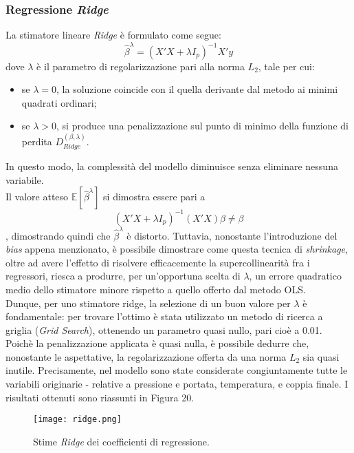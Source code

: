 \documentclass[fleqn,10pt]{SelfArx} %
\begin{document}
\subsubsection{Regressione \textit{Ridge}}
La stimatore lineare \textit{Ridge} \cite{Ridge} è formulato come segue:
\begin{equation}\label{eqridge}
    \hat{\beta}^{\lambda}=(X'X+\lambda I_p)^{-1}X'y
\end{equation}
dove $\lambda$ è il parametro di regolarizzazione pari alla norma $L_2$, tale per cui:
\begin{itemize}
    \item se $\lambda=0$, la soluzione coincide con il quella derivante dal metodo ai minimi quadrati ordinari;
    \item se $\lambda>0$, si produce una penalizzazione sul punto di minimo della funzione di perdita $D_{Ridge}^{(\beta,\lambda)}$.
\end{itemize}
In questo modo, la complessità del modello diminuisce senza eliminare nessuna variabile.\\
Il valore atteso $\mathbb{E}[\hat{\beta}^{\lambda}]$ si dimostra essere pari a
\begin{equation}
   (X'X+\lambda I_p)^{-1}(X'X)\beta\neq\beta 
\end{equation}
, dimostrando quindi che $\hat{\beta}^{\lambda}$ è distorto. Tuttavia, nonostante l'introduzione del \textit{bias} appena menzionato, è possibile dimostrare come questa tecnica di \textit{shrinkage}, oltre ad avere l'effetto di risolvere efficacemente la supercollinearità fra i regressori, riesca a produrre, per un'opportuna scelta di $\lambda$, un errore quadratico medio dello stimatore minore rispetto a quello offerto dal metodo OLS.\\
Dunque, per uno stimatore ridge, la selezione di un buon valore per $\lambda$ è fondamentale: per trovare l'ottimo è stata utilizzato un metodo di ricerca a griglia (\textit{Grid Search}), ottenendo un parametro quasi nullo, pari cioè a 0.01. Poichè la penalizzazione applicata è quasi nulla, è possibile dedurre che, nonostante le aspettative, la regolarizzazione offerta da una norma $L_2$ sia quasi inutile. Precisamente, nel modello sono state considerate congiuntamente tutte le variabili originarie - relative a pressione e portata, temperatura, e coppia finale. I risultati ottenuti sono riassunti in Figura 20.
\begin{figure}[h]
    \centering
    \texttt{[image: ridge.png]}
    \label{fig:em}
    \caption{Stime \textit{Ridge} dei coefficienti di regressione.}
\end{figure}
\end{document}

